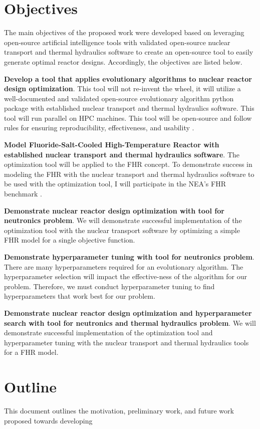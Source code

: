 \section{Objectives}
The main objectives of the proposed work were developed based on leveraging open-source 
artificial intelligence tools with validated open-source nuclear transport and 
thermal hydraulics software to create an open-source tool to easily generate 
optimal reactor designs. 
Accordingly, the objectives are listed below. 
\vspace{0.2cm} 

\noindent
\textbf{Develop a tool that applies evolutionary algorithms to nuclear 
reactor design optimization}. 
This tool will not re-invent the wheel, it will utilize a well-documented 
and validated open-source evolutionary algorithm python package with established 
nuclear transport and thermal hydraulics software. This tool will run parallel on 
\gls{HPC} machines. This tool will be open-source and follow rules for ensuring 
reproducibility, effectiveness, and usability 
\cite{list_ten_2017,osborne_ten_2014,sandve_ten_2013}. 

\vspace{0.2cm} 
\noindent
\textbf{Model Fluoride-Salt-Cooled High-Temperature Reactor with established 
nuclear transport and thermal hydraulics software}.
The optimization tool will be applied to the \gls{FHR} concept. 
To demonstrate success in modeling the \gls{FHR} with the nuclear transport and 
thermal hydraulics software to be used with the optimization tool, I will participate 
in the \gls{NEA}'s \gls{FHR} benchmark \cite{noauthor_fluoride_nodate}. 

\vspace{0.2cm} 
\noindent
\textbf{Demonstrate nuclear reactor design optimization with tool for neutronics problem}. 
We will demonstrate successful implementation of the optimization tool with the 
nuclear transport software by optimizing a simple \gls{FHR} model for a single 
objective function. 

\vspace{0.2cm} 
\noindent
\textbf{Demonstrate hyperparameter tuning with tool for neutronics problem}.
There are many hyperparameters required for an evolutionary algorithm. 
The hyperparameter selection will impact the effective-ness of the algorithm 
for our problem. 
Therefore, we must conduct hyperparameter tuning to find hyperparameters that work 
best for our problem. 

\vspace{0.2cm} 
\noindent
\textbf{Demonstrate nuclear reactor design optimization and hyperparameter 
search with tool for neutronics and thermal hydraulics problem}.
We will demonstrate successful implementation of the optimization tool and 
hyperparameter tuning with the nuclear transport and thermal hydraulics tools 
for a \gls{FHR} model.  


\section{Outline}
This document outlines the motivation, preliminary work, and future work proposed 
towards developing 
